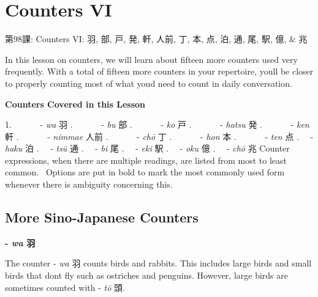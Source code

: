     
\chapter{Counters VI}

\begin{center}
\begin{Large}
第98課: Counters VI: 羽, 部, 戸, 発, 軒, 人前, 丁, 本, 点, 泊, 通, 尾, 駅, 億, \& 兆 
\end{Large}
\end{center}
 
\par{ In this lesson on counters, we will learn about fifteen more counters used very frequently. With a total of fifteen more counters in your repertoire, you\textquotesingle ll be closer to properly counting most of what you\textquotesingle d need to count in daily conversation. }
 
\begin{center}
\textbf{Counters Covered in this Lesson }
\end{center}
 
\par{1.       - \emph{wa }羽 \hfill{}.       - \emph{bu }部 \hfill{}.       - \emph{ko }戸 \hfill{}.       - \emph{hatsu }発 \hfill{}.       - \emph{ken }軒 \hfill{}.       - \emph{nimmae }人前 \hfill{}.       - \emph{chō }丁 \hfill{}.       - \emph{hon }本 \hfill{}.       - \emph{ten }点 \hfill{}.   - \emph{haku }泊 \hfill{}.   - \emph{tsū }通 \hfill{}.   - \emph{bi }尾 \hfill{}.   - \emph{eki }駅 \hfill{}.   - \emph{oku }億 \hfill{}.   - \emph{chō }兆 }
 Counter expressions, when there are multiple readings, are listed from most to least common.  Options are put in bold to mark the most commonly used form whenever there is ambiguity concerning this.       
\section{More Sino-Japanese Counters}
 
\begin{center}
\textbf{- \emph{wa }羽 }
\end{center}

\par{ The counter - \emph{wa }羽 counts birds and rabbits. This includes large birds and small birds that don\textquotesingle t fly such as ostriches and penguins. However, large birds are sometimes counted with - \emph{tō }頭. }


